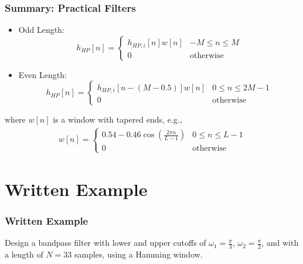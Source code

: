 \documentclass{beamer}
\begin{document}
\begin{frame}
  \frametitle{Summary: Practical Filters}
  \begin{itemize}
  \item Odd Length:
    \[
    h_{HP}[n] = \begin{cases}
      h_{HP,i}[n]w[n] & -M\le n\le M\\
      0 & \mbox{otherwise}
    \end{cases}
    \]
  \item Even Length:
    \[
    h_{HP}[n] = \begin{cases}
      h_{HP,i}\left[n-(M-0.5)\right]w[n] & 0\le n\le 2M-1\\
      0 & \mbox{otherwise}
    \end{cases}
    \]
  \end{itemize}
  where $w[n]$ is a window with tapered ends, e.g.,
  \begin{align*}
    w[n] = \begin{cases}
      0.54-0.46\cos\left(\frac{2\pi n}{L-1}\right) & 0\le n\le L-1\\
      0 &\mbox{otherwise}\end{cases}
  \end{align*}
\end{frame}

\section[Example]{Written Example}
\setcounter{subsection}{1}

\begin{frame}
  \frametitle{Written Example}

  Design a bandpass filter with lower and upper cutoffs of
  $\omega_1=\frac{\pi}{3}$, $\omega_2=\frac{\pi}{2}$, and with a
  length of $N=33$ samples, using a Hamming window.
\end{frame}
\end{document}

